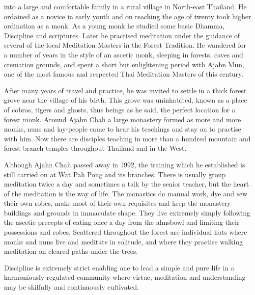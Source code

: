 
 into a large and comfortable family in a rural village in North-east Thailand. He ordained as a novice in early youth and on reaching the age of twenty took higher ordination as a monk.  As a young monk he studied some basic Dhamma, Discipline and scriptures.  Later he practised meditation under the guidance of several of the local Meditation Masters in the Forest Tradition. He wandered for a number of years in the style of an ascetic monk, sleeping in forests, caves and cremation grounds, and spent a short but enlightening period with Ajahn Mun, one of the most famous and respected Thai Meditation Masters of this century.

After many years of travel and practice, he was invited to settle in a thick forest grove near the village of his birth.  This grove was uninhabited, known as a place of cobras, tigers and ghosts, thus beings as he said, the perfect location for a forest monk.  Around Ajahn Chah a large monastery formed as more and more monks, nuns and lay-people came to hear his teachings and stay on to practise with him. Now there are disciples teaching in more than a hundred mountain and forest branch temples throughout Thailand and in the West.

Although Ajahn Chah passed away in 1992, the training which he established is still carried on at Wat Pah Pong and its branches.  There is usually group meditation twice a day and sometimes a talk by the senior teacher, but the heart of the meditation is the way of life.  The monastics do manual work, dye and sew their own robes, make most of their own requisites and keep the monastery buildings and grounds in immaculate shape.  They live extremely simply following the ascetic precepts of eating once a day from the almsbowl and limiting their possessions and robes.  Scattered throughout the forest are individual huts where monks and nuns live and meditate in solitude, and where they practise walking meditation on cleared paths under the trees.

Discipline is extremely strict enabling one to lead a simple and pure life in a harmoniously regulated community where virtue, meditation and understanding may be skilfully and continuously cultivated.

